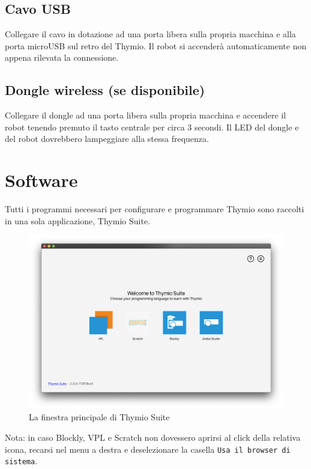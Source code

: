 \documentclass[12pt]{article}
\begin{document}
	\subsection{Cavo USB}
	
		Collegare il cavo in dotazione ad una porta libera sulla propria macchina e alla porta microUSB sul retro del Thymio. Il robot si accenderà automaticamente non appena rilevata la connessione.
		
	\subsection{Dongle wireless (se disponibile)}
	
		Collegare il dongle ad una porta libera sulla propria macchina e accendere il robot tenendo premuto il tasto centrale per circa 3 secondi. Il LED del dongle e del robot dovrebbero lampeggiare alla stessa frequenza.
	

\section{Software}

	Tutti i programmi necessari per configurare e programmare Thymio sono raccolti in una sola applicazione, Thymio Suite.
	
	\begin{figure}[H]
		\includegraphics[width=\textwidth]{img/thymioSuite.png}
		\caption{La finestra principale di Thymio Suite}
		\label{aseba1}
	\end{figure}
	
	Nota: in caso Blockly, VPL e Scratch non dovessero aprirsi al click della relativa icona, recarsi nel menu a destra e deselezionare la casella \texttt{Usa il browser di sistema}.
	
\end{document}
